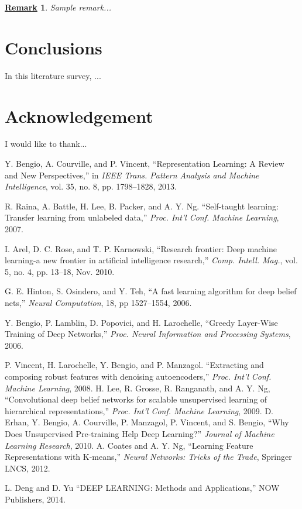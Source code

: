 \documentclass[conference]{IEEEtran}
\newtheorem{remark}{\underline{Remark}}
\begin{document}
\begin{remark}
Sample remark...
\end{remark}


\section{Conclusions}

In this literature survey, ...

\section*{Acknowledgement}
I would like to thank...


\begin{thebibliography}{99}

 Y. Bengio, A. Courville, and P. Vincent, ``Representation Learning: A Review and New Perspectives,'' in \textit{IEEE Trans. Pattern Analysis and Machine Intelligence}, vol. 35, no. 8, pp. 1798--1828, 2013.

 R. Raina, A. Battle, H. Lee, B. Packer, and A. Y. Ng. ``Self-taught learning: Transfer learning from unlabeled data,'' \textit{Proc. Int'l Conf. Machine Learning}, 2007.

 I. Arel, D. C. Rose, and T. P. Karnowski, ``Research frontier: Deep machine learning-a new frontier in artificial intelligence research,'' \textit{Comp. Intell. Mag.}, vol. 5, no. 4, pp. 13--18, Nov. 2010.

 G. E. Hinton, S. Osindero, and Y. Teh, ``A fast learning algorithm for deep belief nets,'' \textit{Neural Computation}, 18, pp 1527--1554, 2006.

  Y. Bengio, P. Lamblin, D. Popovici, and H. Larochelle, ``Greedy Layer-Wise Training of Deep Networks,'' \textit{Proc. Neural Information and Processing Systems}, 2006.

 P. Vincent, H. Larochelle, Y. Bengio, and P. Manzagol. ``Extracting and composing robust features with denoising autoencoders,'' \textit{Proc. Int'l Conf. Machine Learning}, 2008.
 H. Lee, R. Grosse, R. Ranganath, and A. Y. Ng, ``Convolutional deep belief networks for scalable unsupervised learning of hierarchical representations,'' \textit{Proc. Int'l Conf. Machine Learning}, 2009.
 D. Erhan, Y. Bengio, A. Courville, P. Manzagol, P. Vincent, and S. Bengio, ``Why Does Unsupervised Pre-training Help Deep Learning?'' \textit{Journal of Machine Learning Research}, 2010.
 A. Coates and A. Y. Ng, ``Learning Feature Representations with K-means,'' \textit{Neural Networks: Tricks of the Trade}, Springer LNCS, 2012.

 L. Deng and D. Yu ``DEEP LEARNING: Methods and Applications,'' NOW Publishers, 2014.



\end{thebibliography}
\end{document}
